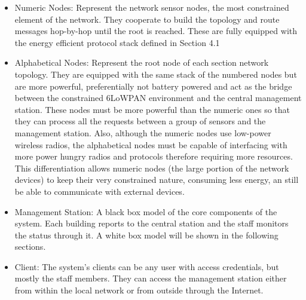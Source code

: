 \begin{itemize}
	\item Numeric Nodes: Represent the network sensor nodes, the most constrained element of the network. They cooperate to build the topology and route messages hop-by-hop until the root is reached. These are fully equipped with the energy efficient protocol stack defined in Section 4.1\\
	\item Alphabetical Nodes: Represent the root node of each section network topology. They are equipped with the same stack of the numbered nodes but are more powerful, preferentially not battery powered and act as the bridge between the constrained 6LoWPAN environment and the central management station. These nodes must be more powerful than the numeric ones so that they can process all the requests between a group of sensors and the management station. Also, although the numeric nodes use low-power wireless radios, the alphabetical nodes must be capable of interfacing with more power hungry radios and protocols therefore requiring more resources. This differentiation allows numeric nodes (the large portion of the network devices) to keep their very constrained nature, consuming less energy, an still be able to communicate with external devices.\\
	\item Management Station: A black box model of the core components of the system. Each building reports to the central station and the staff monitors the status through it. A white box model will be shown in the following sections.\\
	\item Client: The system's clients can be any user with access credentials, but mostly the staff members. They can access the management station either from within the local network or from outside through the Internet.\\
\end{itemize}
 
